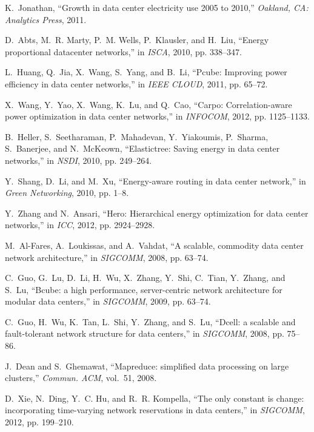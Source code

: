 \documentclass[journal,single-space,two column,twoside,10pt]{IEEEtran}
\begin{document}

\begin{thebibliography}{1}
K.~Jonathan, ``Growth in data center electricity use 2005 to 2010,''
  \emph{Oakland, CA: Analytics Press}, 2011.

D.~Abts, M.~R. Marty, P.~M. Wells, P.~Klausler, and H.~Liu, ``Energy
  proportional datacenter networks,'' in \emph{ISCA}, 2010, pp. 338--347.

L.~Huang, Q.~Jia, X.~Wang, S.~Yang, and B.~Li, ``Pcube: Improving power
  efficiency in data center networks,'' in \emph{IEEE CLOUD}, 2011, pp. 65--72.

X.~Wang, Y.~Yao, X.~Wang, K.~Lu, and Q.~Cao, ``Carpo: Correlation-aware power
  optimization in data center networks,'' in \emph{INFOCOM}, 2012, pp.
  1125--1133.

B.~Heller, S.~Seetharaman, P.~Mahadevan, Y.~Yiakoumis, P.~Sharma, S.~Banerjee,
  and N.~McKeown, ``Elastictree: Saving energy in data center networks,'' in
  \emph{NSDI}, 2010, pp. 249--264.

Y.~Shang, D.~Li, and M.~Xu, ``Energy-aware routing in data center network,'' in
  \emph{Green Networking}, 2010, pp. 1--8.

Y.~Zhang and N.~Ansari, ``Hero: Hierarchical energy optimization for data
  center networks,'' in \emph{ICC}, 2012, pp. 2924--2928.

M.~Al-Fares, A.~Loukissas, and A.~Vahdat, ``A scalable, commodity data center
  network architecture,'' in \emph{SIGCOMM}, 2008, pp. 63--74.

C.~Guo, G.~Lu, D.~Li, H.~Wu, X.~Zhang, Y.~Shi, C.~Tian, Y.~Zhang, and S.~Lu,
  ``Bcube: a high performance, server-centric network architecture for modular
  data centers,'' in \emph{SIGCOMM}, 2009, pp. 63--74.

C.~Guo, H.~Wu, K.~Tan, L.~Shi, Y.~Zhang, and S.~Lu, ``Dcell: a scalable and
  fault-tolerant network structure for data centers,'' in \emph{SIGCOMM}, 2008,
  pp. 75--86.

J.~Dean and S.~Ghemawat, ``Mapreduce: simplified data processing on large
  clusters,'' \emph{Commun. ACM}, vol.~51, 2008.

D.~Xie, N.~Ding, Y.~C. Hu, and R.~R. Kompella, ``The only constant is change:
  incorporating time-varying network reservations in data centers,'' in
  \emph{SIGCOMM}, 2012, pp. 199--210.


\end{thebibliography}
\end{document}
